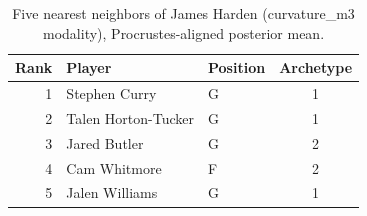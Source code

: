 \begin{table}[htbp]
  \centering\small
  \begin{tabular}{rllc}
    \toprule
    Rank & Player & Position & Archetype \\
    \midrule
    1 & Stephen Curry & G & 1 \\
    2 & Talen Horton-Tucker & G & 1 \\
    3 & Jared Butler & G & 2 \\
    4 & Cam Whitmore & F & 2 \\
    5 & Jalen Williams & G & 1 \\
    \bottomrule
  \end{tabular}
  \caption{Five nearest neighbors of James Harden (curvature_m3 modality), Procrustes-aligned posterior mean.}
  \label{tab:James_Harden_neighbors_curvature_m3}
\end{table}

